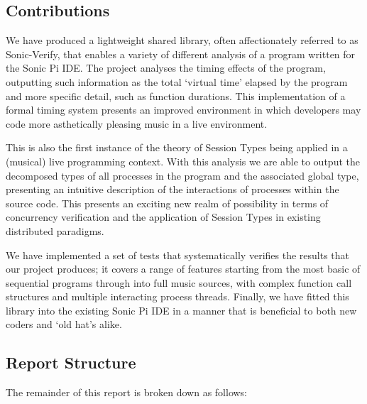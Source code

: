 \documentclass[11pt, abstracton, twoside]{scrartcl}
\begin{document}
\subsection{Contributions}
We have produced a lightweight shared library, often affectionately referred to 
as Sonic-Verify, that enables a variety of different analysis of a program 
written for the Sonic Pi IDE. The project analyses the timing effects of the 
program, outputting such information as the total `virtual time' elapsed by the 
program and more specific detail, such as function durations. This implementation
of a formal timing system presents an improved environment in which developers
may code more asthetically pleasing music in a live environment. 

This is also the first instance of the theory of Session Types being applied in 
a (musical) live programming context. With this analysis we are able to output 
the decomposed types of all processes in the program and the associated global 
type, presenting an intuitive description of the interactions of processes 
within the source code. This presents an exciting new realm of possibility in
terms of concurrency verification and the application of Session Types in 
existing distributed paradigms.

We have implemented a set of tests that systematically verifies the results that
our project produces; it covers a range of features starting from the most basic
of sequential programs through into full music sources, with complex function
call structures and multiple interacting process threads. Finally, we have fitted
this library into the existing Sonic Pi IDE in a manner that is beneficial to both
new coders and `old hat's alike. 

\subsection{Report Structure}
The remainder of this report is broken down as follows:
\end{document}
